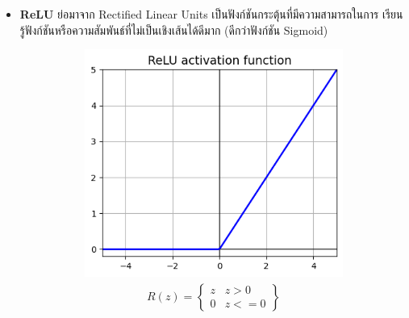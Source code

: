 \begin{itemize}
    \item \textbf{ReLU}\autocite{glorot2011} ย่อมาจาก Rectified Linear Units เป็นฟังก์ชันกระตุ้นที่มีความสามารถในการ%
          เรียนรู้ฟังก์ชันหรือความสัมพันธ์ที่ไม่เป็นเชิงเส้นได้ดีมาก (ดีกว่าฟังก์ชัน Sigmoid)
          \begin{figure}[H]
              \centering
              \begin{subfigure}{0.5\textwidth}
                  \centering
                  \includegraphics[width=0.9\linewidth]{fig/actfunc_relu.png}
                  \caption{%
                      \begin{equation}
                          \begin{split}R(z) =
                              \begin{Bmatrix}
                                  z & z > 0  \\
                                  0 & z <= 0
                              \end{Bmatrix}
                          \end{split}
                      \end{equation}
                  }
                  \label{fig:actfunc_relu}
              \end{subfigure}%
              \begin{subfigure}{0.5\textwidth}
                  \centering

\end{subfigure}
\end{figure}
\end{itemize}

